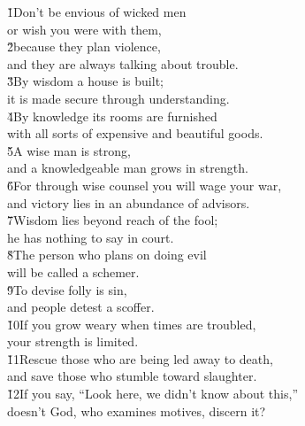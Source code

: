 \begin{poetry}
\poeml {}
\v{1}Don't be envious of wicked men \\
\poeml or wish you were with them, \\
\poeml \v{2}because they plan violence, \\
\poemll    and they are always talking about trouble. \\
\poeml \v{3}By wisdom a house is built; \\
\poemll    it is made secure through understanding. \\
\poeml \v{4}By knowledge its rooms are furnished \\
\poemll    with all sorts of expensive and beautiful goods. \\
\poeml \v{5}A wise man is strong, \\
\poemll    and a knowledgeable man grows in strength. \\
\poeml \v{6}For through wise counsel you will wage your war, \\
\poemll    and victory lies in an abundance of advisors. \\
\poeml \v{7}Wisdom lies beyond reach of the fool; \\
\poemll    he has nothing to say in court. \\
\poeml \v{8}The person who plans on doing evil \\
\poemll    will be called a schemer. \\
\poeml \v{9}To devise folly is sin, \\
\poemll    and people detest a scoffer. \\
\poeml \v{10}If you grow weary when times are troubled, \\
\poemll    your strength is limited. \\
\poeml \v{11}Rescue those who are being led away to death, \\
\poemll    and save those who stumble toward slaughter. \\
\poeml \v{12}If you say, ``Look here, we didn't know about this,'' \\
\poemll    doesn't God, who examines motives, discern it? \\

\end{poetry}
